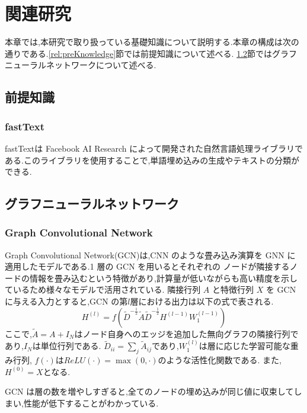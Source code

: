 \documentclass[a4j,twoside,12pt]{thesis} %
\begin{document}
\addtocounter{chapter}{+1}

\setlength{\baselineskip}{1.95zw}
\setlength{\textheight}{30\baselineskip}
\mainmatter

\fi
%
\newcommand{\argminnnn}{\mathop{\rm arg~min}\limits}
\renewcommand\thefootnote{\arabic{footnote})}
\def\vector#1{\mbox{\boldmath $#1$}}

\chapter{関連研究}\label{rel}
本章では,本研究で取り扱っている基礎知識について説明する.本章の構成は次の通りである.\ref{rel:preKnowledge}節では前提知識について述べる. \ref{rel:GNN}節ではグラフニューラルネットワークについて述べる.

\section{前提知識}
\subsection{fastText}
fastText\cite{bojanowski2017enriching}は Facebook AI Research によって開発された自然言語処理ライブラリである.このライブラリを使用することで,単語埋め込みの生成やテキストの分類ができる.

\section{グラフニューラルネットワーク}\label{rel:GNN}
\subsection{Graph Convolutional Network}
Graph Convolutional Network(GCN)は,CNN のような畳み込み演算を GNN に適用したモデルである.1 層の GCN を用いるとそれぞれの
ノードが隣接するノードの情報を畳み込むという特徴があり,計算量が低いながらも高い精度を示しているため様々なモデルで活用されている.
隣接行列 $A$ と特徴行列 $X$ を GCN に与える入力とすると,GCN の第$l$層における出力は以下の式で表される.
\begin{equation}H^{(l)}=f(\tilde{D}^{-\frac{1}{2}}\tilde{A}\tilde{D}^{-\frac{1}{2}}H^{(l-1)}W_{1}^{(l-1)})\end{equation}
ここで,$\tilde{A} = A + I_{N}$はノード自身へのエッジを追加した無向グラフの隣接行列であり,$I_N$は単位行列である.
$\tilde{D}_{ii} = \sum_{j} \tilde{A}_{ij}$であり,$W_{1}^{(l)}$は層に応じた学習可能な重み行列,
$f(\cdot)$は$ReLU(\cdot) = \max (0, \cdot)$のような活性化関数である.
また,$H^{(0)}=X$となる.\par
GCN は層の数を増やしすぎると,全てのノードの埋め込みが同じ値に収束してしまい,性能が低下することがわかっている.
\end{document}
